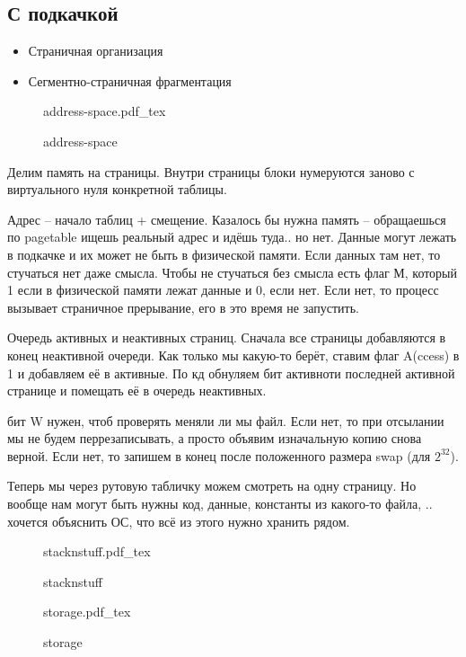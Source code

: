 \documentclass{book}
\theoremstyle{definition}
\newcommand{\incfig}[1]{%
    \def\svgwidth{\columnwidth}
    {#1.pdf_tex}
}
\begin{document}
\subsection{С подкачкой}

\begin{itemize}
    \item Страничная организация
    \item Сегментно-страничная фрагментация
\end{itemize}


\begin{figure}[!ht]
    \centering
    \incfig{address-space}
    \caption{address-space}
    \label{fig:address-space}
\end{figure}

Делим память на страницы. Внутри страницы блоки нумеруются заново с виртуального нуля конкретной таблицы.

Адрес -- начало таблиц + смещение. Казалось бы нужна память -- обращаешься по pagetable ищешь реальный адрес и идёшь туда.. но нет. Данные могут лежать в подкачке и их может не быть в физической памяти. Если данных там нет, то стучаться нет даже смысла. Чтобы не стучаться без смысла есть флаг М, который 1 если в физической памяти лежат данные и 0, если нет. Если нет, то процесс вызывает страничное прерывание, его в это время не запустить.

Очередь активных и неактивных страниц. Сначала все страницы добавляются в конец неактивной очереди. Как только мы какую-то берёт, ставим флаг A(ccess) в 1 и добавляем её в активные. По кд обнуляем бит активноти последней активной странице и помещать её в очередь неактивных.

бит W нужен, чтоб проверять меняли ли мы файл. Если нет, то при отсылании мы не будем перрезаписывать, а просто объявим изначальную копию снова верной. Если нет, то запишем в конец после положенного размера swap (для $2^{32}$).

Теперь мы через рутовую табличку можем смотреть на одну страницу. Но вообще нам могут быть нужны код, данные, константы из какого-то файла, .. хочется объяснить ОС, что всё из этого нужно хранить рядом.

\begin{figure}[!ht]
    \centering
    \incfig{stacknstuff}
    \caption{stacknstuff}
    \label{fig:stacknstuff}
\end{figure}

\begin{figure}[!ht]
    \centering
    \incfig{storage}
    \caption{storage}
    \label{fig:storage}
\end{figure}
\end{document}
